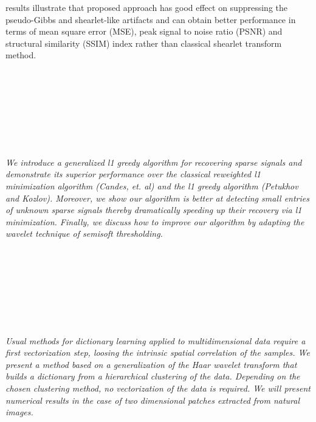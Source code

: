 \begin{multicols}{2}
{results illustrate that proposed approach has good effect on suppressing the pseudo-Gibbs and shearlet-like artifacts and can obtain better performance in terms of mean square  error  (MSE),  peak  signal  to noise  ratio  (PSNR)  and  structural  similarity 
(SSIM) index rather than classical shearlet transform method.}\\
\\ 
        \\
        \\\\
        \\
        \\\\
\\
      \textit{We introduce a generalized l1 greedy algorithm for recovering sparse signals and demonstrate its superior performance over the classical reweighted l1 minimization algorithm (Candes, et. al) and the l1 greedy algorithm (Petukhov and Kozlov). Moreover, we show our algorithm is better at detecting small entries of unknown sparse signals thereby dramatically speeding up their recovery via l1 minimization. Finally, we discuss how to improve our algorithm by adapting the wavelet technique of semisoft thresholding.}\\
\\ 
        \\
        \\\\
        \\
        \\\\
\\
      \textit{Usual methods for dictionary learning applied to multidimensional data require a first vectorization step, loosing the intrinsic spatial correlation of the samples. We present a method based on a generalization of the Haar wavelet transform that builds a dictionary from a hierarchical clustering of the data. Depending on the chosen clustering method, no vectorization of the data is required. We will present numerical results in the case of two dimensional patches extracted from natural images.}\\
\\ 
        \\
        \\\\

\end{multicols}
